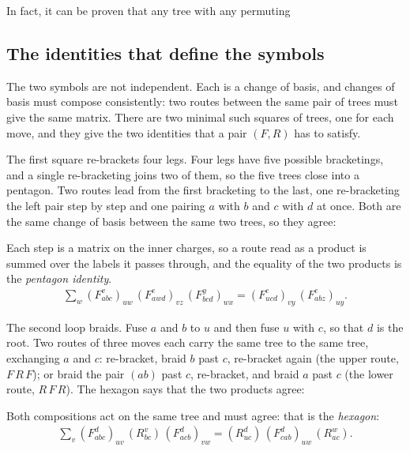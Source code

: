 In fact, it can be proven that any tree with any permuting 

\subsection{The identities that define the symbols}
The two symbols are not independent. Each is a change of basis, and changes of basis must compose consistently: two routes between the same pair of trees must give the same matrix. There are two minimal such squares of trees, one for each move, and they give the two identities that a pair $(F,R)$ has to satisfy.

The first square re-brackets four legs. Four legs have five possible bracketings, and a single re-bracketing joins two of them, so the five trees close into a pentagon. Two routes lead from the first bracketing to the last, one re-bracketing the left pair step by step and one pairing $a$ with $b$ and $c$ with $d$ at once. Both are the same change of basis between the same two trees, so they agree:


Each step is a matrix on the inner charges, so a route read as a product is summed over the labels it passes through, and the equality of the two products is the \emph{pentagon identity}. \begin{align}
    \sum_{w} (F^{v}_{abc})_{uw}\,(F^{e}_{awd})_{vz}\,(F^{y}_{bcd})_{wx} = (F^{e}_{ucd})_{vy}\,(F^{e}_{abz})_{uy}.
\end{align}



The second loop braids. Fuse $a$ and $b$ to $u$ and then fuse $u$ with $c$, so that $d$ is the root. Two routes of three moves each carry the same tree to the same tree, exchanging $a$ and $c$: re-bracket, braid $b$ past $c$, re-bracket again (the upper route, $F\,R\,F$); or braid the pair $(ab)$ past $c$, re-bracket, and braid $a$ past $c$ (the lower route, $R\,F\,R$). The hexagon says that the two products agree:

Both compositions act on the same tree and must agree: that is the \emph{hexagon}:\begin{align}
    \sum_{v} (F^{d}_{abc})_{uv}\,(R_{bc}^v)\,(F^{d}_{acb})_{vw} = (R_{uc}^d)\,(F^{d}_{cab})_{uw}\,(R_{ac}^w).
\end{align}

